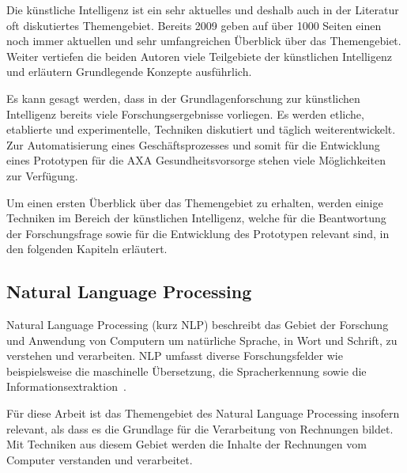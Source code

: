 Die künstliche Intelligenz ist ein sehr aktuelles und deshalb auch in der Literatur oft diskutiertes Themengebiet. Bereits 2009 geben \textcite{Russell2009} auf über 1000 Seiten einen noch immer aktuellen und sehr umfangreichen Überblick über das Themengebiet. Weiter vertiefen die beiden Autoren viele Teilgebiete der künstlichen Intelligenz und erläutern Grundlegende Konzepte ausführlich.


Es kann gesagt werden, dass in der Grundlagenforschung zur künstlichen Intelligenz bereits viele Forschungsergebnisse vorliegen. Es werden etliche, etablierte und experimentelle, Techniken diskutiert und täglich weiterentwickelt. Zur Automatisierung eines Geschäftsprozesses und somit für die Entwicklung eines Prototypen für die AXA Gesundheitsvorsorge stehen viele Möglichkeiten zur Verfügung.

Um einen ersten Überblick über das Themengebiet zu erhalten, werden einige Techniken im Bereich der künstlichen Intelligenz, welche für die Beantwortung der Forschungsfrage sowie für die Entwicklung des Prototypen relevant sind, in den folgenden Kapiteln erläutert.

\subsection{Natural Language Processing}

Natural Language Processing (kurz NLP) beschreibt das Gebiet der Forschung und Anwendung von Computern um natürliche Sprache, in Wort und Schrift, zu verstehen und verarbeiten. NLP umfasst diverse Forschungsfelder wie beispielsweise die maschinelle Übersetzung, die Spracherkennung sowie die Informationsextraktion~\autocite{Chowdhury2003}. 

Für diese Arbeit ist das Themengebiet des Natural Language Processing insofern relevant, als dass es die Grundlage für die Verarbeitung von Rechnungen bildet. Mit Techniken aus diesem Gebiet werden die Inhalte der Rechnungen vom Computer verstanden und verarbeitet.



